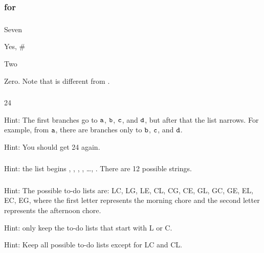 
\subsubsection{\answers for  \substrings} 

\subsubsection*{ \answers}
\begin{apart}
    \item Seven
    \item Yes, \#
    \item Two
    \item Zero.  Note that  is different from .
\end{apart}

\subsubsection*{ \answers}
\begin{apart}
    \item 24
    \item Hint: The first branches go to $\texttt{a}$, $\texttt{b}$, $\texttt{c}$, and $\texttt{d}$, but after that the list narrows. For example, from $\texttt{a}$, there are branches only to $\texttt{b}$, $\texttt{c}$, and $\texttt{d}$.
    \item Hint: You should get 24 again.
\end{apart}

\subsubsection*{ \answers}
Hint: the list begins , , , , \ldots, .  There are 12 possible strings.

\subsubsection*{ \answers}
\begin{apart}
    \item Hint: The possible to-do lists are: LC, LG, LE, CL, CG, CE, GL, GC, GE, EL, EC, EG, where the first letter represents the morning chore and the second letter represents the afternoon chore.
    \item Hint: only keep the to-do lists that start with L or C.
    \item Hint: Keep all possible to-do lists except for LC and CL.
\end{apart}

